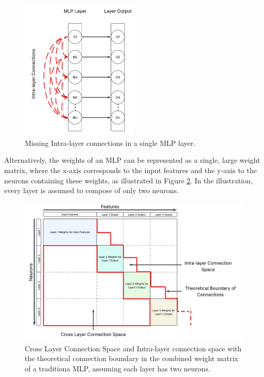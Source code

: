 \begin{enumerate}
    \begin{figure}[h!]
    \centering
    \includegraphics[width=0.5\textwidth, height=0.4\textheight]{Figures/Methodology/intra_layer_connections.png}
    \caption{Missing Intra-layer connections in a single MLP layer.}
    \label{fig:intraLayerConnection}
\end{figure}

\end{enumerate}

Alternatively, the weights of an MLP can be represented as a single, large weight matrix, where the x-axis corresponds to the input features and the y-axis to the neurons containing these weights, as illustrated in Figure \ref{fig:mlpWeights}. In the illustration, every layer is assumed to compose of only two neurons. 

\begin{figure}[h!]
\centering
\includegraphics[width=1.0\textwidth]{Figures/Methodology/mlp_weight_matrix.png}
\caption{Cross Layer Connection Space and Intra-layer connection space with the theoretical connection boundary in the combined weight matrix of a traditiona MLP, assuming each layer has two neurons.}
\label{fig:mlpWeights}
\end{figure}

